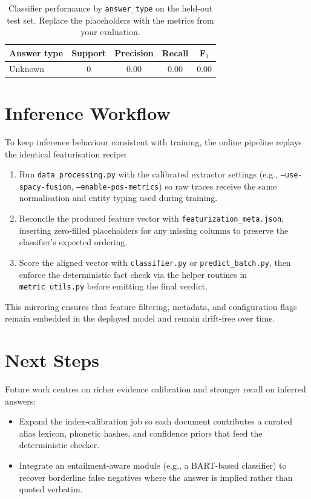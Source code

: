 \documentclass[11pt]{article}
\begin{document}
\begin{table}[ht]
  \centering
  \renewcommand{\arraystretch}{1.15}
  \begin{tabular}{@{}lcccc@{}}
    \toprule
    \textbf{Answer type} & \textbf{Support} & \textbf{Precision} & \textbf{Recall} & \textbf{F$_1$} \\
    \midrule
    Unknown & 0 & 0.00 & 0.00 & 0.00 \\
    \bottomrule
  \end{tabular}
  \caption{Classifier performance by \texttt{answer\_type} on the held-out test set. Replace the placeholders with the metrics from your evaluation.}
  \label{tab:test-answer-counts}
\end{table}

\section{Inference Workflow}
To keep inference behaviour consistent with training, the online pipeline replays the identical featurisation recipe:
\begin{enumerate}
  \item Run \texttt{data\_processing.py} with the calibrated extractor settings (e.g., \texttt{--use-spacy-fusion}, \texttt{--enable-pos-metrics}) so raw traces receive the same normalisation and entity typing used during training.
  \item Reconcile the produced feature vector with \texttt{featurization\_meta.json}, inserting zero-filled placeholders for any missing columns to preserve the classifier's expected ordering.
  \item Score the aligned vector with \texttt{classifier.py} or \texttt{predict\_batch.py}, then enforce the deterministic fact check via the helper routines in \texttt{metric\_utils.py} before emitting the final verdict.
\end{enumerate}
This mirroring ensures that feature filtering, metadata, and configuration flags remain embedded in the deployed model and remain drift-free over time.

\section{Next Steps}
Future work centres on richer evidence calibration and stronger recall on inferred answers:
\begin{itemize}
  \item Expand the index-calibration job so each document contributes a curated alias lexicon, phonetic hashes, and confidence priors that feed the deterministic checker.
  \item Integrate an entailment-aware module (e.g., a BART-based classifier) to recover borderline false negatives where the answer is implied rather than quoted verbatim.
\end{itemize}
\end{document}
